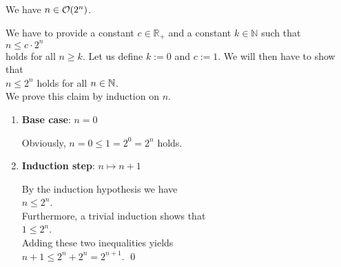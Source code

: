 \example
We have  $n \in \mathcal{O}(2^n)$. 

\proof
We have to provide a constant $c \in \mathbb{R}_+$ and a constant $k\in\mathbb{N}$ such that 
\\[0.2cm]
\hspace*{1.3cm}
$ n \leq c \cdot 2^n$ 
\\[0.2cm]
holds for all $n \geq k$.  Let us define $k := 0$ and $c := 1$.  We will then have to show that \\[0.2cm]
\hspace*{1.3cm} $n \leq 2^n$ \quad holds for all $n \in {\mathbb N}$.
\\[0.2cm]
We prove this claim by induction on $n$.
\begin{enumerate}
\item \textbf{Base case}: $n = 0$

      Obviously, $n = 0 \leq 1 = 2^0 = 2^n$ holds.  
\item \textbf{Induction step}: $n \mapsto n + 1$

      By the induction hypothesis we have 
      \\[0.2cm]
      \hspace*{1.3cm}
      $n \leq 2^n$.    
      \\[0.2cm]
      Furthermore, a trivial induction shows that
      \\[0.2cm]
      \hspace*{1.3cm}
      $1 \leq 2^n$.
      \\[0.2cm]
      Adding these two inequalities yields
      \\[0.2cm]
      \hspace*{1.3cm} $n+1 \leq 2^n + 2^n = 2^{n+1}$. \qed
\end{enumerate}
\pagebreak 

